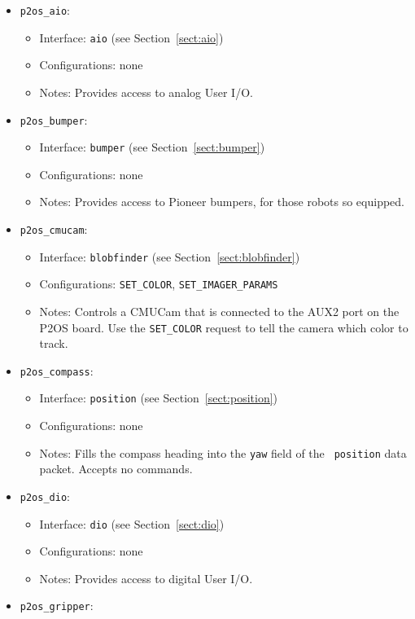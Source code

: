 \begin{itemize}
\item {\tt p2os\_aio}:
  \begin{itemize}
  \item Interface: {\tt aio} (see Section~\ref{sect:aio})
  \item Configurations: none
  \item Notes: Provides access to analog User I/O.
  \end{itemize}
\item {\tt p2os\_bumper}:
  \begin{itemize}
  \item Interface: {\tt bumper} (see Section~\ref{sect:bumper})
  \item Configurations: none
  \item Notes: Provides access to Pioneer bumpers, for those robots so equipped.
  \end{itemize}
\item {\tt p2os\_cmucam}:
  \begin{itemize}
  \item Interface: {\tt blobfinder} (see Section~\ref{sect:blobfinder})
  \item Configurations: {\tt SET\_COLOR}, {\tt SET\_IMAGER\_PARAMS}
  \item Notes: Controls a CMUCam that is connected to the AUX2 port on the
               P2OS board.  Use the {\tt SET\_COLOR} request to tell the
               camera which color to track.
  \end{itemize}
\item {\tt p2os\_compass}:
  \begin{itemize}
  \item Interface: {\tt position} (see Section~\ref{sect:position})
  \item Configurations: none
  \item Notes: Fills the compass heading into the {\tt yaw} field of the {\tt
  position} data packet.  Accepts no commands.
  \end{itemize}
\item {\tt p2os\_dio}:
  \begin{itemize}
  \item Interface: {\tt dio} (see Section~\ref{sect:dio})
  \item Configurations: none
  \item Notes: Provides access to digital User I/O.
  \end{itemize}
\item {\tt p2os\_gripper}:

\end{itemize}
